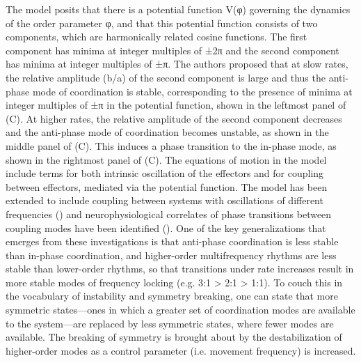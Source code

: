   The \citet{HakenEtAl1985} model posits that there is a potential function V(φ) governing the dynamics of the order parameter φ, and that this potential function consists of two components, which are harmonically related cosine functions. The first component has minima at integer multiples of ±2π and the second component has minima at integer multiples of ±π. The authors proposed that at slow rates, the relative amplitude (b/a) of the second component is large and thus the anti-phase mode of coordination is stable, corresponding to the presence of minima at integer multiples of ±π in the potential function, shown in the leftmost panel of (C). At higher rates, the relative amplitude of the second component decreases and the anti-phase mode of coordination becomes unstable, as shown in the middle panel of (C). This induces a phase transition to the in-phase mode, as shown in the rightmost panel of (C). The equations of motion in the model include terms for both intrinsic oscillation of the effectors and for coupling between effectors, mediated via the potential function. The model has been extended to include coupling between systems with oscillations of different frequencies (\citealt{Haken1996,Kelso1991,PeperEtAl1995,SternadEtAl1999}) and neurophysiological correlates of phase transitions between coupling modes have been identified  (\citealt{JantzenKelso2007,JantzenEtAl2008}). One of the key generalizations that emerges from these investigations is that anti-phase coordination is less stable than in-phase coordination, and higher-order multifrequency rhythms are less stable than lower-order rhythms, so that transitions under rate increases result in more stable modes of frequency locking (e.g. 3:1 > 2:1 > 1:1). To couch this in the vocabulary of instability and symmetry breaking, one can state that more symmetric states—ones in which a greater set of coordination modes are available to the system—are replaced by less symmetric states, where fewer modes are available. The breaking of symmetry is brought about by the destabilization of higher-order modes as a control parameter (i.e. movement frequency) is increased.

